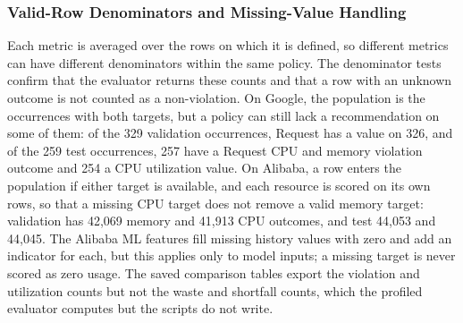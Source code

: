 \subsubsection{Valid-Row Denominators and Missing-Value Handling}\label{sec:6.4.3}

Each metric is averaged over the rows on which it is defined, so different metrics can have different denominators within the same policy. The denominator tests confirm that the evaluator returns these counts and that a row with an unknown outcome is not counted as a non-violation. On Google, the population is the occurrences with both targets, but a policy can still lack a recommendation on some of them: of the 329 validation occurrences, Request has a value on 326, and of the 259 test occurrences, 257 have a Request CPU and memory violation outcome and 254 a CPU utilization value. On Alibaba, a row enters the population if either target is available, and each resource is scored on its own rows, so that a missing CPU target does not remove a valid memory target: validation has 42,069 memory and 41,913 CPU outcomes, and test 44,053 and 44,045. The Alibaba ML features fill missing history values with zero and add an indicator for each, but this applies only to model inputs; a missing target is never scored as zero usage. The saved comparison tables export the violation and utilization counts but not the waste and shortfall counts, which the profiled evaluator computes but the scripts do not write.
